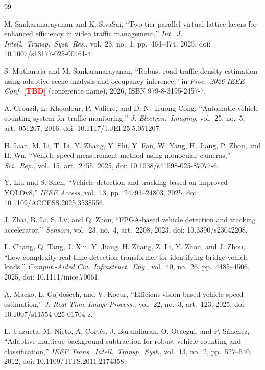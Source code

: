 \documentclass[conference]{IEEEtran}
\newcommand{\TBD}{\textcolor{red}{\textbf{[TBD]}}}
\begin{document}
\begin{thebibliography}{99}

M. Sankaranarayanan and K. SivaSai, ``Two-tier parallel virtual lattice
layers for enhanced efficiency in video traffic management,''
\emph{Int.\ J. Intell.\ Transp.\ Syst.\ Res.}, vol.~23, no.~1,
pp.~464--474, 2025, doi: 10.1007/s13177-025-00461-4.

S. Muthuraja and M. Sankaranarayanan, ``Robust road traffic density
estimation using adaptive scene analysis and occupancy inference,'' in
\emph{Proc.\ 2026 IEEE Conf.} \TBD{} (conference name), 2026, ISBN
979-8-3195-2457-7.

A. Crouzil, L. Khoudour, P. Valiere, and D. N. Truong Cong, ``Automatic
vehicle counting system for traffic monitoring,'' \emph{J. Electron.\
Imaging}, vol.~25, no.~5, art.~051207, 2016, doi:
10.1117/1.JEI.25.5.051207.

H. Lian, M. Li, T. Li, Y. Zhang, Y. Shi, Y. Fan, W. Yang, H. Jiang,
P. Zhou, and H. Wu, ``Vehicle speed measurement method using monocular
cameras,'' \emph{Sci.\ Rep.}, vol.~15, art.~2755, 2025, doi:
10.1038/s41598-025-87077-6.

Y. Liu and S. Shen, ``Vehicle detection and tracking based on improved
YOLOv8,'' \emph{IEEE Access}, vol.~13, pp.~24793--24803, 2025, doi:
10.1109/ACCESS.2025.3538556.

J. Zhai, B. Li, S. Lv, and Q. Zhou, ``FPGA-based vehicle detection and
tracking accelerator,'' \emph{Sensors}, vol.~23, no.~4, art.~2208, 2023,
doi: 10.3390/s23042208.

L. Chang, Q. Tang, J. Xin, Y. Jiang, H. Zhang, Z. Li, Y. Zhou, and
J. Zhou, ``Low-complexity real-time detection transformer for identifying
bridge vehicle loads,'' \emph{Comput.-Aided Civ.\ Infrastruct.\ Eng.},
vol.~40, no.~26, pp.~4485--4506, 2025, doi: 10.1111/mice.70061.

A. Macko, L. Gajdo\v{s}ech, and V. Kocur, ``Efficient vision-based
vehicle speed estimation,'' \emph{J. Real-Time Image Process.}, vol.~22,
no.~3, art.~123, 2025, doi: 10.1007/s11554-025-01704-z.

L. Unzueta, M. Nieto, A. Cort\'es, J. Barandiaran, O. Otaegui, and
P. S\'anchez, ``Adaptive multicue background subtraction for robust
vehicle counting and classification,'' \emph{IEEE Trans.\ Intell.\
Transp.\ Syst.}, vol.~13, no.~2, pp.~527--540, 2012, doi:
10.1109/TITS.2011.2174358.


\end{thebibliography}
\end{document}
